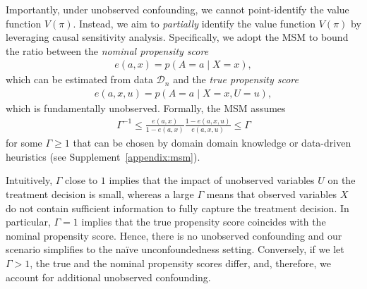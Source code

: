 \documentclass{article} %
\theoremstyle{plain}
\theoremstyle{definition}
\theoremstyle{remark}
\begin{document}
Importantly, under unobserved confounding, we cannot point-identify the value function $V(\pi)$. 
Instead, we aim to \emph{partially} identify the value function $V(\pi)$ by leveraging causal sensitivity analysis. Specifically, we adopt the MSM \citep{Tan.2006} to bound the ratio between the \emph{nominal propensity score}
    \begin{align}\label{eq:nominal_prop}
    e(a,x)=p(A=a\mid X=x), 
    \end{align}
which can be estimated from data $\mathcal{D}_n$ and the \emph{true propensity score}
    \begin{align}\label{eq:true_prop}
    e(a,x,u)=p(A=a\mid X=x,U=u),
    \end{align}
which is fundamentally unobserved. Formally, the MSM assumes
    \begin{align}\label{eq:msm}
        \Gamma^{-1} \leq \frac{e(a,x)}{1-e(a,x)}\frac{1-e(a,x,u)}{e(a,x,u)}\leq \Gamma
    \end{align}
for some $\Gamma \geq 1$ that can be chosen by domain domain knowledge \citep{ Frauen.2023c, Kallus.2019} or data-driven heuristics \citep{Hatt.2022b} (see Supplement~\ref{appendix:msm}).


Intuitively, $\Gamma$ close to $1$ implies that the impact of unobserved variables $U$ on the treatment decision is small, whereas a large $\Gamma$ means that observed variables $X$ do not contain sufficient information to fully capture the treatment decision. In particular, $\Gamma=1$ implies that the true propensity score coincides with the nominal propensity score. Hence, there is no unobserved confounding and our scenario simplifies to the na\"ive unconfoundedness setting. Conversely, if we let $\Gamma>1$, the true and the nominal propensity scores differ, and, therefore, we account for additional unobserved confounding. 
\end{document}
